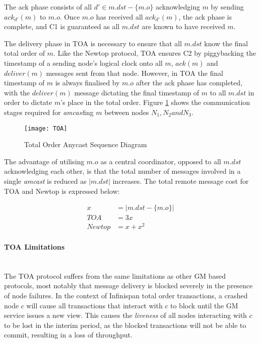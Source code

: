 			The ack phase consists of all $d' \in m.dst-\{m.o\}$ acknowledging $m$ by sending $ack_{d'}(m)$ to $m.o$.  Once $m.o$ has received all $ack_{d'}(m)$, the ack phase is complete, and C1 is guaranteed as all $m.dst$ are known to have received $m$.  
			
			The delivery phase in TOA is necessary to ensure that all $m.dst$ know the final total order of $m$. Like the Newtop protocol, TOA ensures C2 by piggybacking the timestamp of a sending node's logical clock onto all $m$, $ack(m)$ and $deliver(m)$ messages sent from that node.  However, in TOA the final timestamp of $m$ is always finalised by $m.o$ after the ack phase has completed, with the $deliver(m)$ message dictating the final timestamp of $m$ to all $m.dst$ in order to dictate $m$'s place in the total order.  Figure \ref{fig:TOA} shows the communication stages required for \emph{amcast}ing $m$ between nodes $N_1, N_2 and N_3$.  
			
            \begin{figure}[htbp!] 
                \centering    
                \texttt{[image: TOA]}
                \caption[Total Order Anycast Protocol]{Total Order Anycast Sequence Diagram}
                \label{fig:TOA}
            \end{figure}	 			
			
			The advantage of utilising $m.o$ as a central coordinator, opposed to all $m.dst$ acknowledging each other, is that the total number of messages involved in a single \emph{amcast} is reduced as $\left\vert m.dst \right\vert$ increases.  The total remote message cost for TOA and Newtop is expressed below:
			
			\begin{equation*}
		     \begin{aligned}
		       x &= \left\vert m.dst-\{m.o\} \right\vert \\
		       TOA & = 3x \\
		       Newtop & = x + x^2
		     \end{aligned}
		    \end{equation*}

	        \paragraph{TOA Limitations} \hspace{0pt} \\
			The TOA protocol suffers from the same limitations as other GM based protocols, most notably that message delivery is blocked severely in the presence of node failures.  In the context of Infinispan total order transactions, a crashed node $c$ will cause all transactions that interact with $c$ to block until the GM service issues a new view.  This causes the \emph{liveness} of all nodes interacting with $c$ to be lost in the interim period, as the blocked transactions will not be able to commit, resulting in a loss of throughput.  
	        
